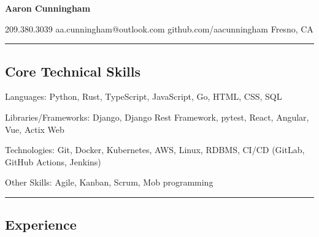 \documentclass[11pt,letterpaper]{article}
\newenvironment{indentsection}[1]%
{\begin{list}{}%
    {\setlength{\leftmargin}{#1}}%
    \item[]%
}
{\end{list}}
\newcommand{\innerbullet}
{\hspace{0.6em}\textbullet\hspace{0.6em}}
\begin{document}
\begin{center}
    {\huge \textbf{Aaron Cunningham}}

    209.380.3039\innerbullet
    aa.cunningham@outlook.com\innerbullet
    github.com/aacunningham\innerbullet
    Fresno, CA
\end{center}


\hrule
\vspace{-0.4em}
\subsection*{Core Technical Skills}

\begin{indentsection}{\parindent}
    \begin{description*}
        \item[Languages:]
            Python, Rust, TypeScript, JavaScript, Go, HTML, CSS, SQL
        \item[Libraries/Frameworks:]
            Django, Django Rest Framework, pytest, React, Angular, Vue, Actix Web
        \item[Technologies:]
            Git, Docker, Kubernetes, AWS, Linux, RDBMS, CI/CD (GitLab, GitHub Actions, Jenkins)
        \item[Other Skills:]
            Agile, Kanban, Scrum, Mob programming
    \end{description*}
\end{indentsection}


\hrule
\vspace{-0.4em}
\subsection*{Experience}
\end{document}
